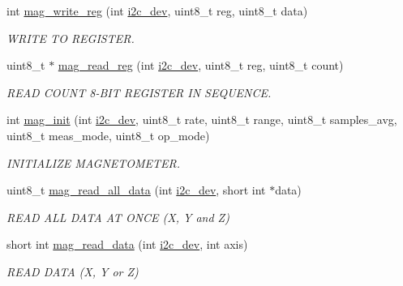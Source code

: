 \begin{DoxyCompactItemize}
\item 
int \hyperlink{mag__functions_01_07C_xC3_xB3pia_01em_01conflito_01de_01Andr_xC3_xA9_01Carvalho_012013-04-26_08_8c_ab5d0ae421cd4bb10b1b7a1eda167416b}{mag\-\_\-write\-\_\-reg} (int \hyperlink{CommunicationV0_2communication_8c_a7751bd45ac1064efb35adf1f19c25db8}{i2c\-\_\-dev}, uint8\-\_\-t reg, uint8\-\_\-t data)
\begin{DoxyCompactList}\small\item\em W\-R\-I\-T\-E T\-O R\-E\-G\-I\-S\-T\-E\-R. \end{DoxyCompactList}\item 
uint8\-\_\-t $\ast$ \hyperlink{mag__functions_01_07C_xC3_xB3pia_01em_01conflito_01de_01Andr_xC3_xA9_01Carvalho_012013-04-26_08_8c_a6830eaeae2298320e1e8c902e4edd709}{mag\-\_\-read\-\_\-reg} (int \hyperlink{CommunicationV0_2communication_8c_a7751bd45ac1064efb35adf1f19c25db8}{i2c\-\_\-dev}, uint8\-\_\-t reg, uint8\-\_\-t count)
\begin{DoxyCompactList}\small\item\em R\-E\-A\-D C\-O\-U\-N\-T 8-\/\-B\-I\-T R\-E\-G\-I\-S\-T\-E\-R I\-N S\-E\-Q\-U\-E\-N\-C\-E. \end{DoxyCompactList}\item 
int \hyperlink{mag__functions_01_07C_xC3_xB3pia_01em_01conflito_01de_01Andr_xC3_xA9_01Carvalho_012013-04-26_08_8c_a014f908c9faa37c1ec75177a17012a01}{mag\-\_\-init} (int \hyperlink{CommunicationV0_2communication_8c_a7751bd45ac1064efb35adf1f19c25db8}{i2c\-\_\-dev}, uint8\-\_\-t rate, uint8\-\_\-t range, uint8\-\_\-t samples\-\_\-avg, uint8\-\_\-t meas\-\_\-mode, uint8\-\_\-t op\-\_\-mode)
\begin{DoxyCompactList}\small\item\em I\-N\-I\-T\-I\-A\-L\-I\-Z\-E M\-A\-G\-N\-E\-T\-O\-M\-E\-T\-E\-R. \end{DoxyCompactList}\item 
uint8\-\_\-t \hyperlink{mag__functions_01_07C_xC3_xB3pia_01em_01conflito_01de_01Andr_xC3_xA9_01Carvalho_012013-04-26_08_8c_a8f2fd896caf1216ba82e535e6251692f}{mag\-\_\-read\-\_\-all\-\_\-data} (int \hyperlink{CommunicationV0_2communication_8c_a7751bd45ac1064efb35adf1f19c25db8}{i2c\-\_\-dev}, short int $\ast$data)
\begin{DoxyCompactList}\small\item\em R\-E\-A\-D A\-L\-L D\-A\-T\-A A\-T O\-N\-C\-E (X, Y and Z) \end{DoxyCompactList}\item 
short int \hyperlink{mag__functions_01_07C_xC3_xB3pia_01em_01conflito_01de_01Andr_xC3_xA9_01Carvalho_012013-04-26_08_8c_a542a31ccd07cd2c3e8e2b68cdb6d219e}{mag\-\_\-read\-\_\-data} (int \hyperlink{CommunicationV0_2communication_8c_a7751bd45ac1064efb35adf1f19c25db8}{i2c\-\_\-dev}, int axis)
\begin{DoxyCompactList}\small\item\em R\-E\-A\-D D\-A\-T\-A (X, Y or Z) \end{DoxyCompactList}\end{DoxyCompactItemize}


